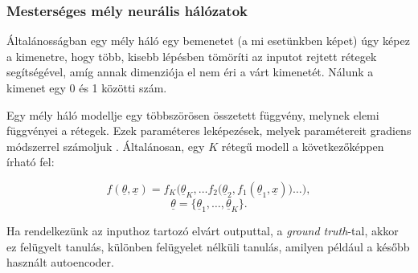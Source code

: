 \subsubsection{Mesterséges mély neurális hálózatok}






Általánosságban egy mély háló egy bemenetet (a mi esetünkben képet) úgy képez
a kimenetre, hogy több, kisebb lépésben tömöríti az inputot rejtett rétegek segítségével,
amíg annak dimenziója el nem éri a várt kimenetét. Nálunk a kimenet egy 0 és 1 közötti szám.



Egy mély háló modellje egy többszörösen összetett függvény, melynek elemi függvényei a rétegek. Ezek paraméteres leképezések, melyek paramétereit gradiens módszerrel számoljuk \cite{lecun2015deep, krizhevsky2012imagenet}. Általánosan, egy $ K $ rétegű modell a következőképpen írható fel:

\[ 
f(\underline{\theta},\underline{x})=f_K\Big(\underline{\theta}_K, \dots f_2\big(\underline{\theta}_2, f_1(\underline{\theta}_1, \underline{x}) \big) \dots \Big) ,
 \]
 \[ \underline{\theta} = \{\underline{\theta}_1, \dots, \underline{\theta}_K\} . \]




Ha rendelkezünk az inputhoz tartozó elvárt outputtal, a \textit{ground truth}-tal, akkor ez felügyelt tanulás, különben felügyelet nélküli tanulás, amilyen például a később használt autoencoder.


